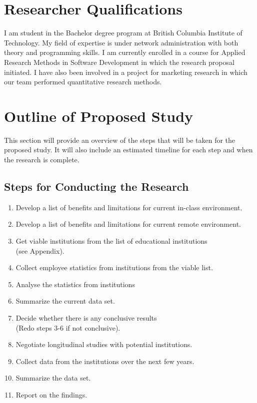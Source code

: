 \documentclass[titlepage]{article}
\begin{document}
\section{Researcher Qualifications}
I am student in the Bachelor degree program at British Columbia Institute of Technology.
My field of expertise is under network administration with both theory and programming skills.
I am currently enrolled in a course for Applied Research Methods in Software Development
in which the research proposal initiated.  I have also been involved in a project for
marketing research in which our team performed quantitative research methods.

\clearpage

\section{Outline of Proposed Study}
This section will provide an overview of the steps that will be taken for the proposed study.
It will also include an estimated timeline for each step and when the research is complete.

\subsection{Steps for Conducting the Research}
\begin{enumerate}
	\item Develop a list of benefits and limitations for current in-class environment.
	\item Develop a list of benefits and limitations for current remote environment.
	\item Get viable institutions from the  list of educational institutions \\(see Appendix).
	\item Collect employee statistics from institutions from the viable list.
	\item Analyse the statistics from institutions
	\item Summarize the current data set.
	\item Decide whether there is any conclusive results \\
		  (Redo steps 3-6 if not conclusive).
	\item Negotiate longitudinal studies with potential institutions.
	\item Collect data from the institutions over the next few years.
	\item Summarize the data set.
	\item Report on the findings.
\end{enumerate}
\end{document}
